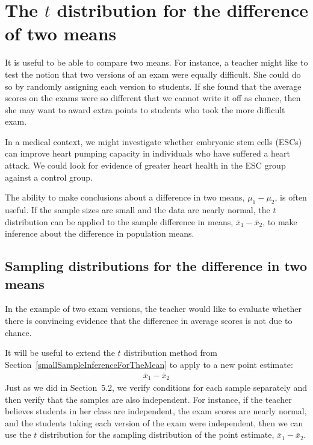 \section{The $t$ distribution for the difference of two means}

It is useful to be able to compare two means. For instance, a teacher might like to test the notion that two versions of an exam were equally difficult. She could do so by randomly assigning each version to students. If she found that the average scores on the exams were so different that we cannot write it off as chance, then she may want to award extra points to students who took the more difficult exam.

In a medical context, we might investigate whether embryonic stem cells (ESCs) can improve heart pumping capacity in individuals who have suffered a heart attack. We could look for evidence of greater heart health in the ESC group against a control group. %

The ability to make conclusions about a difference in two means, $\mu_1 - \mu_2$, is often useful. If the sample sizes are small and the data are nearly normal, the $t$ distribution can be applied to the sample difference in means, $\bar{x}_1 - \bar{x}_2$, to make inference about the difference in population means.

\subsection{Sampling distributions for the difference in two means}

In the example of two exam versions, the teacher would like to evaluate whether there is convincing evidence that the difference in average scores is not due to chance.

It will be useful to extend the $t$ distribution method from Section~\ref{smallSampleInferenceForTheMean} to apply to a new point estimate:
\begin{eqnarray*}
\bar{x}_1 - \bar{x}_2
\end{eqnarray*}
Just as we did in Section~5.2, %
we verify conditions for each sample separately and then verify that the samples are also independent. For instance, if the teacher believes students in her class are independent, the exam scores are nearly normal, and the students taking each version of the exam were independent, then we can use the $t$ distribution for the sampling distribution of the point estimate, $\bar{x}_{1} - \bar{x}_{2}$.

